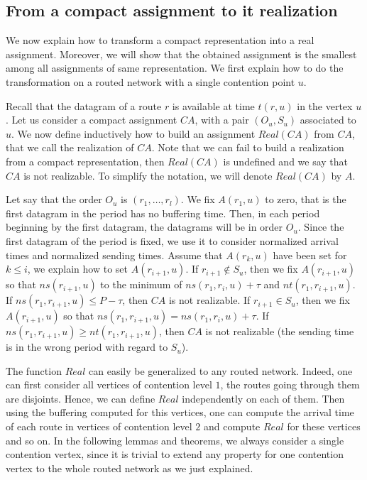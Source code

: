 \documentclass[english]{article}
\begin{document}
\subsection{From a compact assignment to it realization}



We now explain how to transform a compact representation into a real assignment.
Moreover, we will show that the obtained assignment is the smallest among all assignments of same representation. We first explain how to do the transformation on a routed network with a single contention point $u$.

Recall that the datagram of a route $r$ is available at time $t(r,u)$ in the vertex $u$.
Let us consider a compact assignment $CA$, with a pair $(O_u,S_u)$ associated to $u$.
We now define inductively how to build an assignment $Real(CA)$ from $CA$, that we call the realization of $CA$. Note that we can fail to build a realization from a compact representation,
then $Real(CA)$ is undefined and we say that $CA$ is not realizable. To simplify the notation, we will denote $Real(CA)$ by $A$.

Let say that the order $O_u$ is $(r_1, \dots, r_l)$. We fix $A(r_1,u)$ to zero, that is the first
datagram in the period has no buffering time. Then, in each period beginning by the first datagram, the datagrams will be in order $O_u$. Since the first datagram of the period is fixed, we use it to consider normalized arrival times and normalized sending times.
Assume that $A(r_k,u)$ have been set for $k \leq i$, we explain how to 
set $A(r_{i+1},u)$. If $r_{i+1} \notin S_u$, then we fix $A(r_{i+1},u)$ so that $ns(r_{i+1},u)$ to the minimum of $ns(r_1,r_i,u) + \tau$ and $nt(r_1,r_{i+1},u)$. If $ns(r_1,r_{i+1},u) \leq P - \tau$, then $CA$ is not realizable. If $r_{i+1} \in S_u$, then we fix $A(r_{i+1},u)$ so that $ns(r_1, r_{i+1},u) = ns(r_1,r_i,u) + \tau$. If $ns(r_1, r_{i+1},u) \geq nt(r_1,r_{i+1},u)$, then $CA$ is not realizable (the sending time is in the wrong period with regard to $S_u$). 

                       
The function $Real$ can easily be generalized to any routed network. Indeed, one can first consider all vertices of contention level $1$, the routes going through them are disjoints. Hence, we can define $Real$ independently on each of them. 
Then using the buffering computed for this vertices, one can compute the arrival time of each route in vertices of contention level $2$ and compute $Real$ for these vertices and so on. In the following lemmas and theorems, we always consider a single contention vertex, since it is trivial to extend any property for one contention vertex to the whole routed network as we just explained. 
\end{document}
